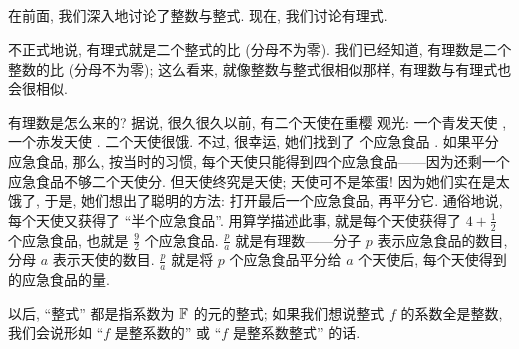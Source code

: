 \subsection*{\DefinitionOfRationalExpressions}
\markright{\DefinitionOfRationalExpressions}

在前面, 我们深入地讨论了整数与整式. 现在, 我们讨论有理式.

不正式地说, 有理式就是二个整式的比 (分母不为零). 我们已经知道, 有理数是二个整数的比 (分母不为零); 这么看来, 就像整数与整式很相似那样, 有理数与有理式也会很相似.

有理数是怎么来的? 据说, 很久很久以前, 有二个天使在重樱  观光: 一个青发天使 , 一个赤发天使 . 二个天使很饿. 不过, 很幸运, 她们找到了  个应急食品 . 如果平分应急食品, 那么, 按当时的习惯, 每个天使只能得到四个应急食品——因为还剩一个应急食品不够二个天使分. 但天使终究是天使; 天使可不是笨蛋! 因为她们实在是太饿了, 于是, 她们想出了聪明的方法: 打开最后一个应急食品, 再平分它. 通俗地说, 每个天使又获得了 ``半个应急食品''. 用算学描述此事, 就是每个天使获得了 $4 + \frac{1}{2}$ 个应急食品, 也就是 $\frac{9}{2}$ 个应急食品. $\frac{p}{a}$ 就是有理数——分子 $p$ 表示应急食品的数目, 分母 $a$ 表示天使的数目. $\frac{p}{a}$ 就是将 $p$ 个应急食品平分给 $a$ 个天使后, 每个天使得到的应急食品的量.

以后, ``整式'' 都是指系数为 $\mathbb{F}$ 的元的整式; 如果我们想说整式 $f$ 的系数全是整数, 我们会说形如 ``$f$ 是整系数的'' 或 ``$f$ 是整系数整式'' 的话.

